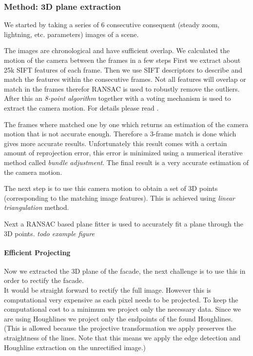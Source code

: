 \subsubsection{Method: 3D plane extraction}
We started by taking a series of 6 consecutive consequent (steady zoom, lightning, etc. parameters) images of a scene.


The images are chronological and have sufficient overlap. 
We calculated the motion of the camera between the frames in a few steps
First we extract about 25k SIFT features of each frame.  Then we use
SIFT descriptors to describe and match the features within the consecutive
frames.  Not all features will overlap or match in the frames therefor RANSAC is used to
robustly remove the outliers.  After this an \emph{8-point algorithm} together with a
voting mechanism is used to extract the camera motion. For details please read
\cite{Fit3d}.

The frames where matched one by one which returns an estimation of the camera
motion that is not accurate enough.  Therefore a 3-frame match is done which
gives more accurate results.  Unfortunately this result comes with a certain
amount of reprojection error, this error is minimized using a numerical
iterative method called \emph{bundle adjustment}.  The final result is a very
accurate estimation of the camera motion.

The next step is to use this camera motion to obtain a set of 3D points
(corresponding to the matching image features).  This is achieved using \emph{linear triangulation}
method. 

Next a RANSAC based plane fitter is used to accurately fit a plane through
the 3D points. 
\emph{todo example figure}

\paragraph{Efficient Projecting} 
Now we extracted the 3D plane of the facade, the next challenge is to use this in order to rectify the facade.\\

It would be straight forward to rectify the full image. However this is
computational very expensive as each pixel needs to be projected. To keep the
computational cost to a minimum we project only the necessary data. Since we
are using Houghlines we project only the endpoints of the found Houghlines. 
(This is allowed because the projective transformation we apply preserves the
straightness of the lines. Note that this means we apply the edge detection and
Houghline extraction on the unrectified image.)\\

